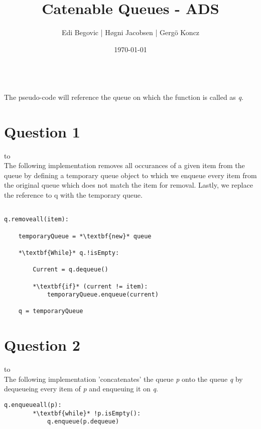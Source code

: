 \documentclass[a4paper]{article}
\title{Catenable Queues - ADS}
\author{Edi Begovic | Høgni Jacobsen | Gergö Koncz}
\date{\today}
\def\headline#1{\hbox to \hsize{\hrulefill\quad\lower.3em\hbox{#1}\quad\hrulefill}}
\begin{document}
 
\maketitle

\ \\
\noindent
The pseudo-code will reference the queue on which the function is called as \textit{q}.
\ \\
\section*{Question 1}
\headline{-} \ \\

\noindent
The following implementation removes all occurances of a given item from the queue by defining a temporary queue
object to which we enqueue every item from the original queue which does not match the item for removal. 
Lastly, we replace the reference to q with the temporary queue.

\noindent
\begin{lstlisting}[escapeinside={{*}{*}}]

q.removeall(item):

    temporaryQueue = *\textbf{new}* queue

    *\textbf{While}* q.!isEmpty:

        Current = q.dequeue()
        
        *\textbf{if}* (current != item):
            temporaryQueue.enqueue(current)
    
    q = temporaryQueue

\end{lstlisting}

\newpage
\section*{Question 2}
\headline{-} \ \\
The following implementation 'concatenates' the queue \textit{p} onto the queue \textit{q} by
dequeueing every item of \textit{p} and enqueuing it on \textit{q}.
 \\

\noindent

\begin{lstlisting}[escapeinside={{*}{*}}]
    q.enqueueall(p):
        *\textbf{while}* !p.isEmpty():
            q.enqueue(p.dequeue)
\end{lstlisting}

\ \\
\end{document}
